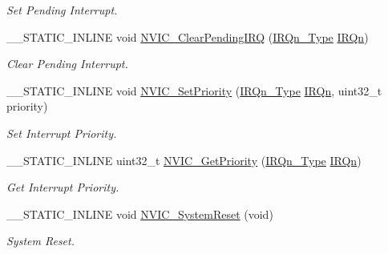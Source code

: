 \begin{DoxyCompactItemize}
\begin{DoxyCompactList}\small\item\em Set Pending Interrupt. \end{DoxyCompactList}\item 
\+\_\+\+\_\+\+S\+T\+A\+T\+I\+C\+\_\+\+I\+N\+L\+I\+NE void \hyperlink{group___c_m_s_i_s___core___n_v_i_c_functions_ga332e10ef9605dc6eb10b9e14511930f8}{N\+V\+I\+C\+\_\+\+Clear\+Pending\+I\+RQ} (\hyperlink{group___configuration__section__for___c_m_s_i_s_gac3af4a32370fb28c4ade8bf2add80251}{I\+R\+Qn\+\_\+\+Type} \hyperlink{group___configuration__section__for___c_m_s_i_s_ga666eb0caeb12ec0e281415592ae89083}{I\+R\+Qn})
\begin{DoxyCompactList}\small\item\em Clear Pending Interrupt. \end{DoxyCompactList}\item 
\+\_\+\+\_\+\+S\+T\+A\+T\+I\+C\+\_\+\+I\+N\+L\+I\+NE void \hyperlink{group___c_m_s_i_s___core___n_v_i_c_functions_ga2305cbd44aaad792e3a4e538bdaf14f9}{N\+V\+I\+C\+\_\+\+Set\+Priority} (\hyperlink{group___configuration__section__for___c_m_s_i_s_gac3af4a32370fb28c4ade8bf2add80251}{I\+R\+Qn\+\_\+\+Type} \hyperlink{group___configuration__section__for___c_m_s_i_s_ga666eb0caeb12ec0e281415592ae89083}{I\+R\+Qn}, uint32\+\_\+t priority)
\begin{DoxyCompactList}\small\item\em Set Interrupt Priority. \end{DoxyCompactList}\item 
\+\_\+\+\_\+\+S\+T\+A\+T\+I\+C\+\_\+\+I\+N\+L\+I\+NE uint32\+\_\+t \hyperlink{group___c_m_s_i_s___core___n_v_i_c_functions_ga1cbaf8e6abd4aa4885828e7f24fcfeb4}{N\+V\+I\+C\+\_\+\+Get\+Priority} (\hyperlink{group___configuration__section__for___c_m_s_i_s_gac3af4a32370fb28c4ade8bf2add80251}{I\+R\+Qn\+\_\+\+Type} \hyperlink{group___configuration__section__for___c_m_s_i_s_ga666eb0caeb12ec0e281415592ae89083}{I\+R\+Qn})
\begin{DoxyCompactList}\small\item\em Get Interrupt Priority. \end{DoxyCompactList}\item 
\+\_\+\+\_\+\+S\+T\+A\+T\+I\+C\+\_\+\+I\+N\+L\+I\+NE void \hyperlink{group___c_m_s_i_s___core___n_v_i_c_functions_ga1143dec48d60a3d6f238c4798a87759c}{N\+V\+I\+C\+\_\+\+System\+Reset} (void)
\begin{DoxyCompactList}\small\item\em System Reset. \end{DoxyCompactList}\item 

\end{DoxyCompactItemize}
